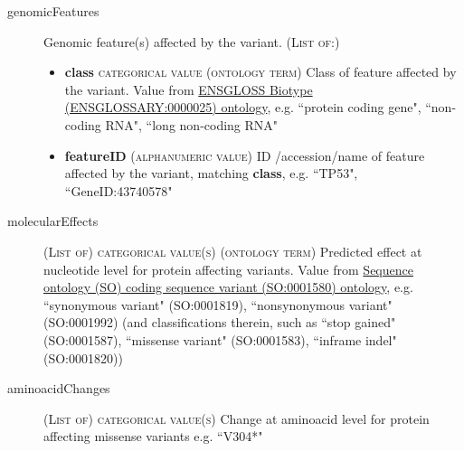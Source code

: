 \documentclass[a4paper, 10pt]{article}        %
\begin{document}
\begin{description}
	\item[genomicFeatures] Genomic feature(s) affected by the variant. {\textsc{(List of:)}}
	\begin{itemize}
			\item[]  \textbf{class} {\textsc{categorical value (ontology term)}} Class of feature affected by the variant. Value from \href{http://ensembl.org/glossary/ENSGLOSSARY_0000025}{ENSGLOSS Biotype (ENSGLOSSARY:0000025) ontology}, e.g. ``protein coding gene", ``non-coding RNA", ``long non-coding RNA"
			\item[]  \textbf{featureID} {\textsc{(alphanumeric value)}} ID /accession/name of feature affected by the variant, matching \textbf{class}, e.g. ``TP53", ``GeneID:43740578"
	\end{itemize} 
	\item[molecularEffects] {\textsc{(List of) categorical value(s) (ontology term)}} Predicted effect at nucleotide level for protein affecting variants. Value from \href{http://purl.obolibrary.org/obo/SO_0001580}{Sequence ontology (SO) coding sequence variant (SO:0001580) ontology}, e.g. ``synonymous variant" (SO:0001819), ``nonsynonymous variant" (SO:0001992) (and classifications therein, such as ``stop gained" (SO:0001587), ``missense variant" (SO:0001583), ``inframe indel" (SO:0001820))
	\item[aminoacidChanges]  {\textsc{(List of) categorical value(s)}} Change at aminoacid level for protein affecting missense variants e.g. ``V304*"
	
 \end{description}



\end{document}
